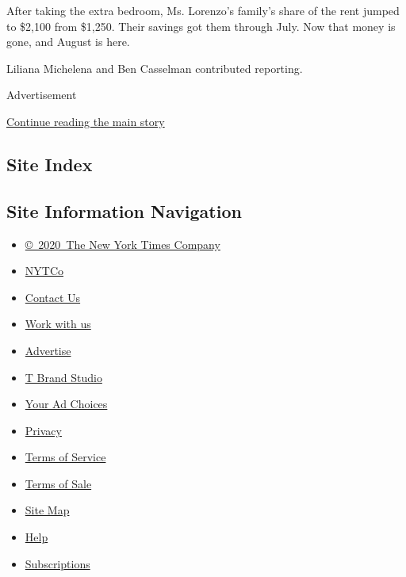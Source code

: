 After taking the extra bedroom, Ms. Lorenzo's family's share of the rent
jumped to \$2,100 from \$1,250. Their savings got them through July. Now
that money is gone, and August is here.

Liliana Michelena and Ben Casselman contributed reporting.

Advertisement

\protect\hyperlink{after-bottom}{Continue reading the main story}

\hypertarget{site-index}{%
\subsection{Site Index}\label{site-index}}

\hypertarget{site-information-navigation}{%
\subsection{Site Information
Navigation}\label{site-information-navigation}}

\begin{itemize}
\tightlist
\item
  \href{https://help.nytimes.com/hc/en-us/articles/115014792127-Copyright-notice}{©~2020~The
  New York Times Company}
\end{itemize}

\begin{itemize}
\tightlist
\item
  \href{https://www.nytco.com/}{NYTCo}
\item
  \href{https://help.nytimes.com/hc/en-us/articles/115015385887-Contact-Us}{Contact
  Us}
\item
  \href{https://www.nytco.com/careers/}{Work with us}
\item
  \href{https://nytmediakit.com/}{Advertise}
\item
  \href{http://www.tbrandstudio.com/}{T Brand Studio}
\item
  \href{https://www.nytimes.com/privacy/cookie-policy\#how-do-i-manage-trackers}{Your
  Ad Choices}
\item
  \href{https://www.nytimes.com/privacy}{Privacy}
\item
  \href{https://help.nytimes.com/hc/en-us/articles/115014893428-Terms-of-service}{Terms
  of Service}
\item
  \href{https://help.nytimes.com/hc/en-us/articles/115014893968-Terms-of-sale}{Terms
  of Sale}
\item
  \href{https://spiderbites.nytimes.com}{Site Map}
\item
  \href{https://help.nytimes.com/hc/en-us}{Help}
\item
  \href{https://www.nytimes.com/subscription?campaignId=37WXW}{Subscriptions}
\end{itemize}
